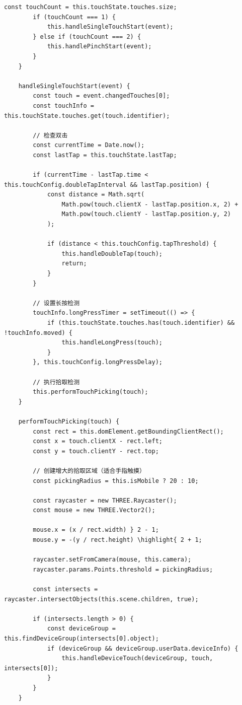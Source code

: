\begin{lstlisting}[style=javascript]
        const touchCount = this.touchState.touches.size;
        if (touchCount === 1) {
            this.handleSingleTouchStart(event);
        } else if (touchCount === 2) {
            this.handlePinchStart(event);
        }
    }
    
    handleSingleTouchStart(event) {
        const touch = event.changedTouches[0];
        const touchInfo = this.touchState.touches.get(touch.identifier);
        
        // 检查双击
        const currentTime = Date.now();
        const lastTap = this.touchState.lastTap;
        
        if (currentTime - lastTap.time < this.touchConfig.doubleTapInterval && lastTap.position) {
            const distance = Math.sqrt(
                Math.pow(touch.clientX - lastTap.position.x, 2) +
                Math.pow(touch.clientY - lastTap.position.y, 2)
            );
            
            if (distance < this.touchConfig.tapThreshold) {
                this.handleDoubleTap(touch);
                return;
            }
        }
        
        // 设置长按检测
        touchInfo.longPressTimer = setTimeout(() => {
            if (this.touchState.touches.has(touch.identifier) && !touchInfo.moved) {
                this.handleLongPress(touch);
            }
        }, this.touchConfig.longPressDelay);
        
        // 执行拾取检测
        this.performTouchPicking(touch);
    }
    
    performTouchPicking(touch) {
        const rect = this.domElement.getBoundingClientRect();
        const x = touch.clientX - rect.left;
        const y = touch.clientY - rect.top;
        
        // 创建增大的拾取区域（适合手指触摸）
        const pickingRadius = this.isMobile ? 20 : 10;
        
        const raycaster = new THREE.Raycaster();
        const mouse = new THREE.Vector2();
        
        mouse.x = (x / rect.width) } 2 - 1;
        mouse.y = -(y / rect.height) \highlight{ 2 + 1;
        
        raycaster.setFromCamera(mouse, this.camera);
        raycaster.params.Points.threshold = pickingRadius;
        
        const intersects = raycaster.intersectObjects(this.scene.children, true);
        
        if (intersects.length > 0) {
            const deviceGroup = this.findDeviceGroup(intersects[0].object);
            if (deviceGroup && deviceGroup.userData.deviceInfo) {
                this.handleDeviceTouch(deviceGroup, touch, intersects[0]);
            }
        }
    }
    

\end{lstlisting}
